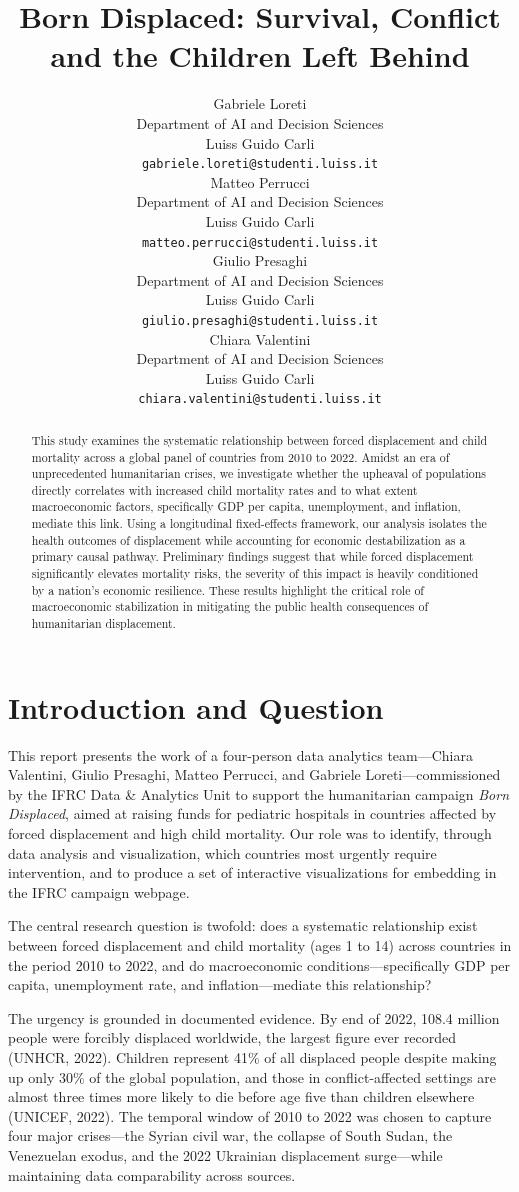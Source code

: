 \documentclass{article}
\title{Born Displaced: Survival, Conflict and the Children Left Behind}
\author{%
  Gabriele Loreti \\
  Department of AI and Decision Sciences\\
  Luiss Guido Carli\\
  \texttt{gabriele.loreti@studenti.luiss.it} \\
  \And
  Matteo Perrucci \\
  Department of AI and Decision Sciences\\
  Luiss Guido Carli\\
  \texttt{matteo.perrucci@studenti.luiss.it} \\
  \AND
  Giulio Presaghi \\
  Department of AI and Decision Sciences\\
  Luiss Guido Carli\\
  \texttt{giulio.presaghi@studenti.luiss.it} \\
  \And
  Chiara Valentini \\
  Department of AI and Decision Sciences\\
  Luiss Guido Carli\\
  \texttt{chiara.valentini@studenti.luiss.it} \\
}
\begin{document}
\maketitle


\begin{abstract}
This study examines the systematic relationship between forced displacement and child mortality across a global panel of countries from 2010 to 2022. Amidst an era of unprecedented humanitarian crises, we investigate whether the upheaval of populations directly correlates with increased child mortality rates and to what extent macroeconomic factors, specifically GDP per capita, unemployment, and inflation, mediate this link. Using a longitudinal fixed-effects framework, our analysis isolates the health outcomes of displacement while accounting for economic destabilization as a primary causal pathway. Preliminary findings suggest that while forced displacement significantly elevates mortality risks, the severity of this impact is heavily conditioned by a nation’s economic resilience. These results highlight the critical role of macroeconomic stabilization in mitigating the public health consequences of humanitarian displacement.
\end{abstract}

\section{Introduction and Question}

This report presents the work of a four-person data analytics team---Chiara Valentini, Giulio Presaghi, Matteo Perrucci, and Gabriele Loreti---commissioned by the IFRC Data \& Analytics Unit to support the humanitarian campaign \textit{Born Displaced}, aimed at raising funds for pediatric hospitals in countries affected by forced displacement and high child mortality. Our role was to identify, through data analysis and visualization, which countries most urgently require intervention, and to produce a set of interactive visualizations for embedding in the IFRC campaign webpage.

The central research question is twofold: does a systematic relationship exist between forced displacement and child mortality (ages 1 to 14) across countries in the period 2010 to 2022, and do macroeconomic conditions---specifically GDP per capita, unemployment rate, and inflation---mediate this relationship?

The urgency is grounded in documented evidence. By end of 2022, 108.4 million people were forcibly displaced worldwide, the largest figure ever recorded (UNHCR, 2022). Children represent 41\% of all displaced people despite making up only 30\% of the global population, and those in conflict-affected settings are almost three times more likely to die before age five than children elsewhere (UNICEF, 2022). The temporal window of 2010 to 2022 was chosen to capture four major crises---the Syrian civil war, the collapse of South Sudan, the Venezuelan exodus, and the 2022 Ukrainian displacement surge---while maintaining data comparability across sources.
\end{document}
